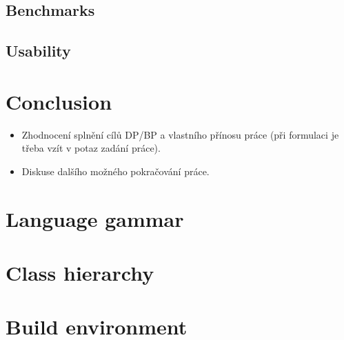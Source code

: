 \documentclass[11pt,twoside,a4paper]{book}
\begin{document}
\section{Benchmarks}

\section{Usability}



\chapter{Conclusion}

\begin{itemize}
\item Zhodnocení splnění cílů DP/BP a  vlastního přínosu práce (při formulaci je třeba vzít v potaz zadání práce).
\item Diskuse dalšího možného pokračování práce.
\end{itemize}



%
%
%



\appendix


\chapter{Language gammar}



\chapter{Class hierarchy}



\chapter{Build environment}
\end{document}
